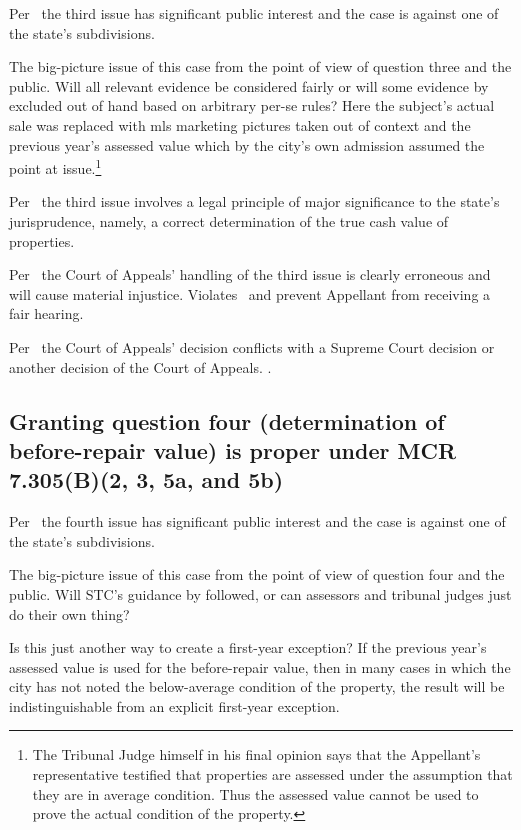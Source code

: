 \documentclass[12pt,\documentclassflag]{michiganCourtOfAppealsBrief}
\begin{document}
Per \cite{MCR 7.305(B)(2)}\ the third issue has significant public interest and the case is against one of the state's subdivisions.

The big-picture issue of this case from the point of view of question three and the public. Will all relevant evidence be considered fairly or will some evidence by excluded out of hand based on arbitrary per-se rules? Here the subject's actual sale was replaced with mls marketing pictures taken out of context and the previous year's assessed value which by the city's own admission assumed the point at issue.\footnote{The Tribunal Judge himself in his final opinion says that the Appellant's representative testified that properties are assessed under the assumption that they are in average condition. Thus the assessed value cannot be used to prove the actual condition of the property.}

Per \cite{MCR 7.305(B)(3)}\ the third issue involves a legal principle of major significance to the state's jurisprudence, namely, a correct determination of the true cash value of properties. 

Per \cite{MCR 7.305(B)(5a)}\ the Court of Appeals' handling of the third issue is clearly erroneous and will cause material injustice. Violates \cite{Jones & Laughlin}\ and prevent Appellant from receiving a fair hearing.

Per \cite{MCR 7.305(B)(5b)}\ the Court of Appeals' decision conflicts with a Supreme Court decision or another decision of the Court of Appeals. \cite{Jones & Laughlin}.

\subsection{Granting question four (determination of before-repair value) is proper under MCR 7.305(B)(2, 3, 5a, and 5b)}

Per \cite{MCR 7.305(B)(2)}\ the fourth issue has significant public interest and the case is against one of the state's subdivisions.

The big-picture issue of this case from the point of view of question four and the public. Will STC's guidance by followed, or can assessors and tribunal judges just do their own thing?

Is this just another way to create a first-year exception? If the previous year's assessed value is used for the before-repair value, then in many cases in which the city has not noted the below-average condition of the property, the result will be indistinguishable from an explicit first-year exception. 
\end{document}
